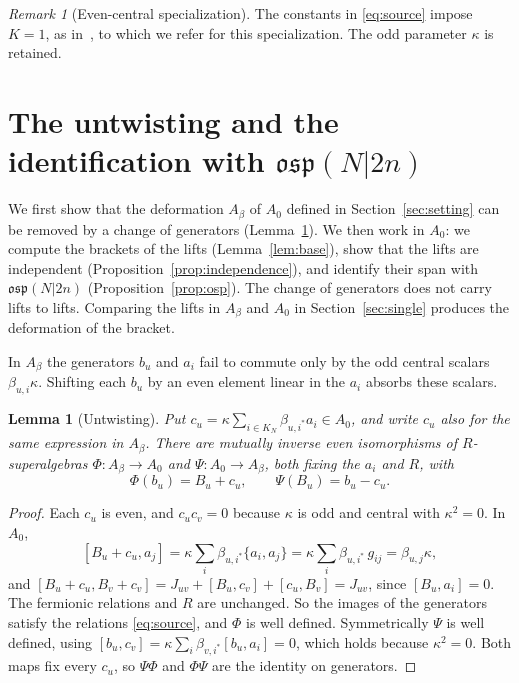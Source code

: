 \documentclass[11pt]{article}
\numberwithin{equation}{section}
\newtheorem{lemma}[theorem]{Lemma}
\theoremstyle{definition}
\theoremstyle{remark}
\newtheorem{remark}[theorem]{Remark}
\newcommand{\osp}{\mathfrak{osp}}
\begin{document}
\begin{remark}[Even-central specialization]\label{rem:central}
The constants in \eqref{eq:source} impose $K=1$, as in~\cite[Remark~2.1]{Aoi26}, to which we
refer for this specialization. The odd parameter $\kappa$ is retained.
\end{remark}

\section{The untwisting and the identification with \texorpdfstring{$\osp(N|2n)$}{osp(N|2n)}}\label{sec:untwist-base}

We first show that the deformation $A_\beta$ of $A_0$ defined in Section~\ref{sec:setting} can be
removed by a change of generators (Lemma~\ref{lem:untwist}). We then work in $A_0$: we compute the
brackets of the lifts (Lemma~\ref{lem:base}), show that the lifts are independent
(Proposition~\ref{prop:independence}), and identify their span with $\osp(N|2n)$
(Proposition~\ref{prop:osp}). The change of generators does not carry lifts to lifts. Comparing
the lifts in $A_\beta$ and $A_0$ in Section~\ref{sec:single} produces the deformation of the bracket.

In $A_\beta$ the generators $b_u$ and $a_i$ fail to commute only by the odd central scalars
$\beta_{u,i}\kappa$. Shifting each $b_u$ by an even element linear in the $a_i$ absorbs these scalars.

\begin{lemma}[Untwisting]\label{lem:untwist}
Put $c_u=\kappa\sum_{i\in K_N}\beta_{u,i^*}a_i\in A_0$, and write $c_u$ also for the same expression in
$A_\beta$. There are mutually inverse even
isomorphisms of $R$-superalgebras $\Phi\colon A_\beta\to A_0$ and $\Psi\colon A_0\to A_\beta$,
both fixing the $a_i$ and $R$, with
\[
 \Phi(b_u)=B_u+c_u,\qquad \Psi(B_u)=b_u-c_u .
\]
\end{lemma}

\begin{proof}
Each $c_u$ is even, and $c_uc_v=0$ because $\kappa$ is odd and central with
$\kappa^2=0$. In $A_0$,
\[
 [B_u+c_u,a_j]=\kappa\sum_i\beta_{u,i^*}\{a_i,a_j\}
 =\kappa\sum_i\beta_{u,i^*}\,g_{ij}=\beta_{u,j}\kappa,
\]
and $[B_u+c_u,B_v+c_v]=J_{uv}+[B_u,c_v]+[c_u,B_v]=J_{uv}$, since $[B_u,a_i]=0$.
The fermionic relations and $R$ are unchanged. So the images of the generators satisfy
the relations \eqref{eq:source}, and $\Phi$ is well defined. Symmetrically $\Psi$ is well defined, using
$[b_u,c_v]=\kappa\sum_i\beta_{v,i^*}[b_u,a_i]=0$, which holds because $\kappa^2=0$.
Both maps fix every $c_u$, so $\Psi\Phi$ and $\Phi\Psi$ are the identity on
generators.
\end{proof}
\end{document}
